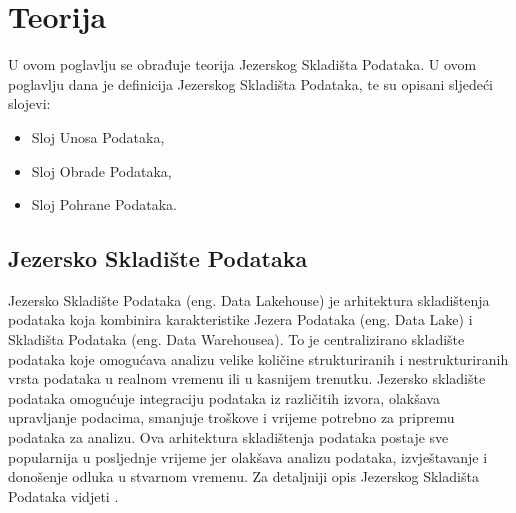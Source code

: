 \chapter{Teorija}
U ovom poglavlju se obrađuje teorija Jezerskog Skladišta Podataka. U ovom
poglavlju dana je definicija Jezerskog Skladišta Podataka, te su opisani
sljedeći slojevi:
\begin{itemize}
    \item Sloj Unosa Podataka,
    \item Sloj Obrade Podataka,
    \item Sloj Pohrane Podataka.
\end{itemize}

\section{Jezersko Skladište Podataka}
Jezersko Skladište Podataka (eng. Data Lakehouse) je arhitektura skladištenja
podataka koja kombinira karakteristike Jezera Podataka (eng. Data Lake) i
Skladišta Podataka (eng. Data Warehousea). To je centralizirano skladište
podataka koje omogućava analizu velike količine strukturiranih i
nestrukturiranih vrsta podataka u realnom vremenu ili u kasnijem trenutku.
Jezersko skladište podataka omogućuje integraciju podataka iz različitih izvora,
olakšava upravljanje podacima, smanjuje troškove i vrijeme potrebno za pripremu
podataka za analizu. Ova arhitektura skladištenja podataka postaje sve
popularnija u posljednje vrijeme jer olakšava analizu podataka, izvještavanje i
donošenje odluka u stvarnom vremenu. Za detaljniji opis Jezerskog Skladišta
Podataka vidjeti \citep{datalakehouse2022}.
